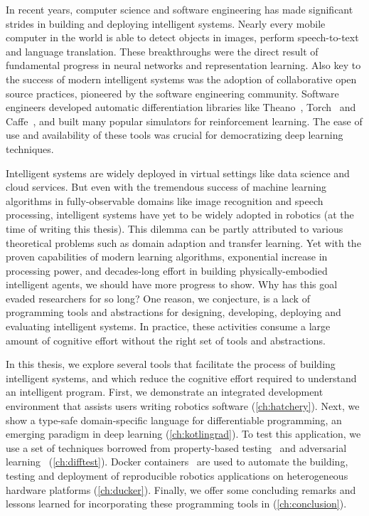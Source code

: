 \documentclass[12pt,initial,twoside,maitrise]{dms}
\numberwithin{equation}{section}
\numberwithin{table}{chapter}
\numberwithin{figure}{chapter}
\begin{document}
In recent years, computer science and software engineering has made significant strides in building and deploying intelligent systems. Nearly every mobile computer in the world is able to detect objects in images, perform speech-to-text and language translation. These breakthroughs were the direct result of fundamental progress in neural networks and representation learning. Also key to the success of modern intelligent systems was the adoption of collaborative open source practices, pioneered by the software engineering community. Software engineers developed automatic differentiation libraries like Theano~\citep{bergstra2010theano}, Torch~\citep{collobert2002torch} and Caffe~\citep{jia2014caffe}, and built many popular simulators for reinforcement learning. The ease of use and availability of these tools was crucial for democratizing deep learning techniques.

Intelligent systems are widely deployed in virtual settings like data science and cloud services. But even with the tremendous success of machine learning algorithms in fully-observable domains like image recognition and speech processing, intelligent systems have yet to be widely adopted in robotics (at the time of writing this thesis). This dilemma can be partly attributed to various theoretical problems such as domain adaption and transfer learning. Yet with the proven capabilities of modern learning algorithms, exponential increase in processing power, and decades-long effort in building physically-embodied intelligent agents, we should have more progress to show. Why has this goal evaded researchers for so long? One reason, we conjecture, is a lack of programming tools and abstractions for designing, developing, deploying and evaluating intelligent systems. In practice, these activities consume a large amount of cognitive effort without the right set of tools and abstractions.

In this thesis, we explore several tools that facilitate the process of building intelligent systems, and which reduce the cognitive effort required to understand an intelligent program. First, we demonstrate an integrated development environment that assists users writing robotics software (\autoref{ch:hatchery}). Next, we show a type-safe domain-specific language for differentiable programming, an emerging paradigm in deep learning (\autoref{ch:kotlingrad}). To test this application, we use a set of techniques borrowed from property-based testing~\citep{fink1997property} and adversarial learning~\citep{lowd2005adversarial} (\autoref{ch:difftest}). Docker containers~\citep{merkel2014docker} are used to automate the building, testing and deployment of reproducible robotics applications on heterogeneous hardware platforms (\autoref{ch:ducker}). Finally, we offer some concluding remarks and lessons learned for incorporating these programming tools in (\autoref{ch:conclusion}).
\end{document}
